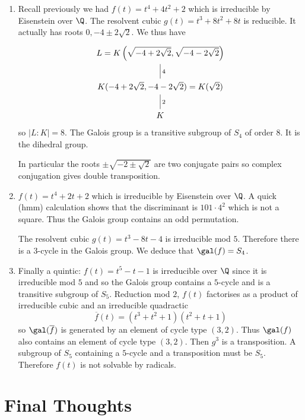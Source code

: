 \documentclass[a4paper]{article}
\newcommand*{\red}[1]{\overline{#1}}
\begin{document}
\begin{eg}\leavevmode
  \begin{enumerate}
  \item Recall previously we had \(f(t) = t^4 + 4t^2 + 2\) which is irreducible by Eisenstein over \(\Q\). The resolvent cubic \(g(t) = t^3 + 8t^2 + 8t\) is reducible. It actually has roots \(0, -4 \pm 2\sqrt 2\). We thus have
    \[
      \begin{tikzcd}
        L = K \left(\sqrt{-4 + 2\sqrt 2}, \sqrt{-4 - 2\sqrt 2} \right) \ar[d, dash, "4"] \\
        K(-4 + 2\sqrt 2, -4 - 2\sqrt 2) = K(\sqrt 2) \ar[d, dash, "2"] \\
        K
      \end{tikzcd}
    \]
    so \(|L:K| = 8\). The Galois group is a transitive subgroup of \(S_4\) of order \(8\). It is the dihedral group.

    In particular the roots \(\pm \sqrt{-2 \pm \sqrt 2}\) are two conjugate pairs so complex conjugation gives double transposition.
  \item \(f(t) = t^4 + 2t + 2\) which is irreducible by Eisenstein over \(\Q\). A quick (hmm) calculation shows that the discriminant is \(101 \cdot 4^2\) which is not a square. Thus the Galois group contains an odd permutation.

    The resolvent cubic \(g(t) = t^3 - 8t - 4\) is irreducible mod \(5\). Therefore there is a \(3\)-cycle in the Galois group. We deduce that \(\gal(f) = S_4\).
  \item Finally a quintic: \(f(t) = t^5 - t - 1\) is irreducible over \(\Q\) since it is irreducible mod \(5\) and so the Galois group contains a \(5\)-cycle and is a transitive subgroup of \(S_5\). Reduction mod \(2\), \(f(t)\) factorises as a product of irreducible cubic and an irreducible quadractic
    \[
      \red f(t) = (t^3 + t^2 + 1)(t^2 + t + 1)
    \]
    so \(\gal(\red f)\) is generated
    by an element of cycle type \((3, 2)\). Thus \(\gal(f)\) also contains an element of cycle type \((3, 2)\). Then \(g^3\) is a transposition. A subgroup of \(S_5\) containing a \(5\)-cycle and a transposition must be \(S_5\). Therefore \(f(t)\) is not solvable by radicals.
  \end{enumerate}
\end{eg}

\section{Final Thoughts}
\end{document}
